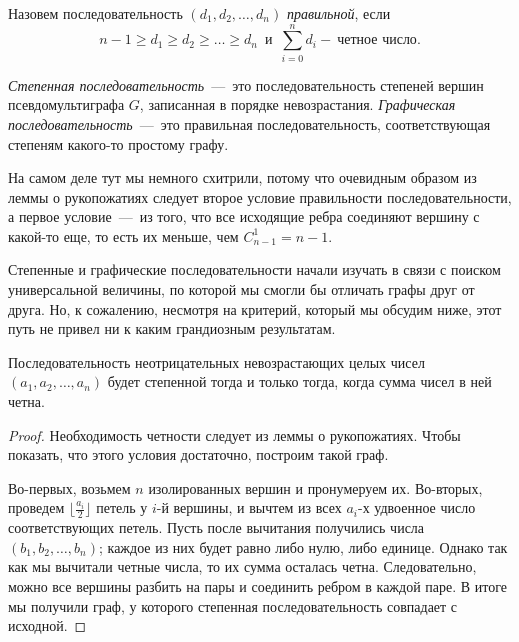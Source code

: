 \begin{definition}
	Назовем последовательность $(d_1, d_2, \dots, d_n)$ \emph{правильной}, если 
	$$n-1 \geqslant d_1 \geqslant d_2 \geqslant \dots \geqslant d_n \;\ \text{и} \;\ \sum_{i=0}^n d_i - \!\ \text{четное число}.$$  
\end{definition}

\begin{definition}
	\emph{Степенная последовательность}~---~это последовательность степеней вершин псевдомультиграфа $G$, записанная в порядке невозрастания. 
	\emph{Графическая последовательность}~---~это правильная последовательность, соответствующая степеням какого-то простому графу.
\end{definition}

	На самом деле тут мы немного схитрили, потому что очевидным образом из леммы о рукопожатиях следует второе условие 
	правильности последовательности, а первое условие~---~из того, что все исходящие ребра соединяют вершину с какой-то еще, 
	то есть их меньше, чем $C_{n-1}^1 = n-1$. 
	
	Степенные и графические последовательности начали изучать в связи с поиском универсальной величины, по которой мы смогли 
	бы отличать графы друг от друга. Но, к сожалению, несмотря на критерий, который мы обсудим ниже, этот путь не привел ни к 
	каким грандиозным результатам.	
	
\begin{statement}
	Последовательность неотрицательных невозрастающих целых чисел $(a_1, a_2, \dots, a_n)$ будет степенной тогда и только тогда, 
	когда сумма чисел в ней четна.
	
\begin{proof}
	Необходимость четности следует из леммы о рукопожатиях. Чтобы показать, что этого условия достаточно, построим такой граф.
	
	Во-первых, возьмем $n$ изолированных вершин и пронумеруем их. Во-вторых, проведем $\lfloor \frac{a_i}{2} \rfloor$ петель у $i$-й вершины, 
	и вычтем из всех $a_i$-х удвоенное число соответствующих петель. Пусть после вычитания получились числа $(b_1, b_2, \dots, b_n)$; 
	каждое из них будет равно либо нулю, либо единице. Однако так как мы вычитали четные числа, то их сумма осталась четна. 
	Следовательно, можно все вершины разбить на пары и соединить ребром в каждой паре. В итоге мы получили граф, 
	у которого степенная последовательность совпадает с исходной.
\end{proof}\end{statement}

